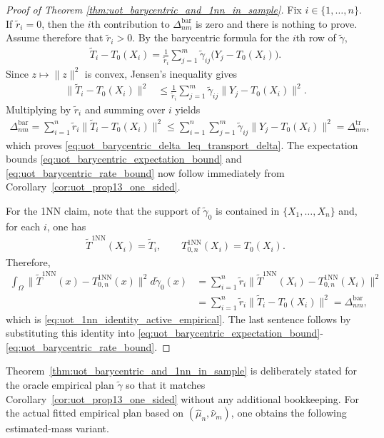 \documentclass[11pt,reqno]{amsart}
\theoremstyle{definition}
\renewcommand{\hat}{\widehat}
\renewcommand{\tilde}{\widetilde}
\begin{document}
\begin{proof}[Proof of Theorem \ref{thm:uot_barycentric_and_1nn_in_sample}]
Fix $i\in\{1,\dots,n\}$.
If $\tilde r_i=0$, then the $i$th contribution to $\Delta_{nm}^{\mathrm{bar}}$ is zero and there is nothing to prove.
Assume therefore that $\tilde r_i>0$.
By the barycentric formula for the $i$th row of $\tilde\gamma$,
\begin{align}
    \tilde T_i-T_0(X_i)
    =
    \frac{1}{\tilde r_i}
    \sum_{j=1}^m \tilde\gamma_{ij}\bigl(Y_j-T_0(X_i)\bigr).
\end{align}
Since $z\mapsto \|z\|^2$ is convex, Jensen's inequality gives
\begin{align}
    \|\tilde T_i-T_0(X_i)\|^2
    &\le
    \frac{1}{\tilde r_i}
    \sum_{j=1}^m \tilde\gamma_{ij}  \|Y_j-T_0(X_i)\|^2.
\end{align}
Multiplying by $\tilde r_i$ and summing over $i$ yields
\begin{align}
    \Delta_{nm}^{\mathrm{bar}}
    = \sum_{i=1}^n \tilde r_i \|\tilde T_i-T_0(X_i)\|^2 \le \sum_{i=1}^n \sum_{j=1}^m \tilde\gamma_{ij}  \|Y_j-T_0(X_i)\|^2
    = \Delta_{nm}^{\mathrm{tr}},
\end{align}
which proves \eqref{eq:uot_barycentric_delta_leq_transport_delta}.
The expectation bounds \eqref{eq:uot_barycentric_expectation_bound} and \eqref{eq:uot_barycentric_rate_bound} now follow immediately from Corollary~\ref{cor:uot_prop13_one_sided}.

For the 1NN claim, note that the support of $\tilde\gamma_0$ is contained in $\{X_1,\dots,X_n\}$ and, for each $i$, one has
\begin{align}
    \tilde T^{\mathrm{1NN}}(X_i)=\tilde T_i,
    \qquad
    T_{0,n}^{\mathrm{1NN}}(X_i)=T_0(X_i).
\end{align}
Therefore,
\begin{align}
    \int_\Omega \|\tilde T^{\mathrm{1NN}}(x)-T_{0,n}^{\mathrm{1NN}}(x)\|^2  d\tilde\gamma_0(x)
    &= \sum_{i=1}^n \tilde r_i  \|\tilde T^{\mathrm{1NN}}(X_i)-T_{0,n}^{\mathrm{1NN}}(X_i)\|^2 \\
    &= \sum_{i=1}^n \tilde r_i  \|\tilde T_i-T_0(X_i)\|^2
    = \Delta_{nm}^{\mathrm{bar}},
\end{align}
which is \eqref{eq:uot_1nn_identity_active_empirical}.
The last sentence follows by substituting this identity into \eqref{eq:uot_barycentric_expectation_bound}-\eqref{eq:uot_barycentric_rate_bound}.
\end{proof}

Theorem~\ref{thm:uot_barycentric_and_1nn_in_sample} is deliberately stated for the oracle empirical plan $\tilde\gamma$ so that it matches Corollary~\ref{cor:uot_prop13_one_sided} without any additional bookkeeping.
For the actual fitted empirical plan based on $(\hat\mu_n,\hat\nu_m)$, one obtains the following estimated-mass variant.
\end{document}

